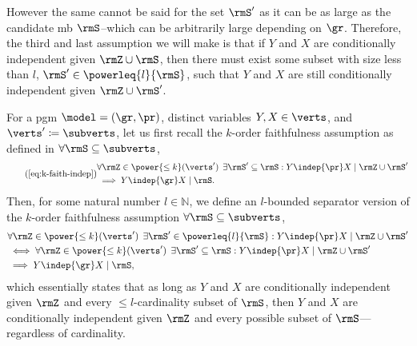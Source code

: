 \documentclass[accepted]{uai2026} %
\theoremstyle{plain}
\theoremstyle{definition}
\theoremstyle{remark}
\begin{document}
However the same cannot be said for the set $\rmS'$ as it can be as
large as the candidate \gls{mb} $\rmS$--which can be arbitrarily
large depending on $\gr$. Therefore, the third and last assumption we
will make is that if $Y$ and $X$ are conditionally independent given
$\rmZ\cup\rmS$, then there must exist some subset with size less than
$l$, $\rmS'\in\powerleq{l}{\rmS}$, such that $Y$ and $X$ are still
conditionally independent given $\rmZ\cup\rmS'$. 

\begin{assumption}\label{def:bound-sep}
  For a \gls{pgm} $\model=(\gr,\pr)$, distinct variables $Y,X\in\verts$,
  and $\verts'\coloneq \subverts$, let us first recall the $k$-order
  faithfulness assumption as defined in 
  $\forall\rmS \subseteq \subverts$,
  \begin{gather}
    \tag{\ref{eq:k-faith-indep}}
    \begin{aligned}
      &\forall \rmZ \in \power{\leq k}(\verts')\:\:
        \exists \rmS' \subseteq \rmS :
      Y \indep{\pr} X \mid \rmZ \cup \rmS'\\
      &\implies
      Y \indep{\gr} X \mid \rmS.
    \end{aligned}
  \end{gather}
  Then, for some natural number $l\in\mathbb{N}$, we define an
  $l$-bounded separator version of the $k$-order faithfulness assumption
  $\forall\rmS \subseteq \subverts$,
  \begin{gather}
    \begin{aligned}
      &\forall \rmZ \in \power{\leq k}(\verts')\:\:
        \exists \rmS' \in \powerleq{l}{\rmS}:
        Y \indep{\pr} X \mid \rmZ \cup \rmS'\\
      &\iff
        \forall \rmZ \in \power{\leq k}(\verts')\:\:
        \exists \rmS' \subseteq \rmS :
      Y \indep{\pr} X \mid \rmZ \cup \rmS'\\
      &\implies
      Y \indep{\gr} X \mid \rmS,
    \end{aligned}
  \end{gather}
  which essentially states that as long as $Y$ and $X$ are conditionally
  independent given $\rmZ$ and every $\leq l$-cardinality subset of
  $\rmS$, then $Y$ and $X$ are conditionally independent given $\rmZ$
  and every possible subset of $\rmS$---regardless of cardinality.


\end{assumption}
\end{document}
